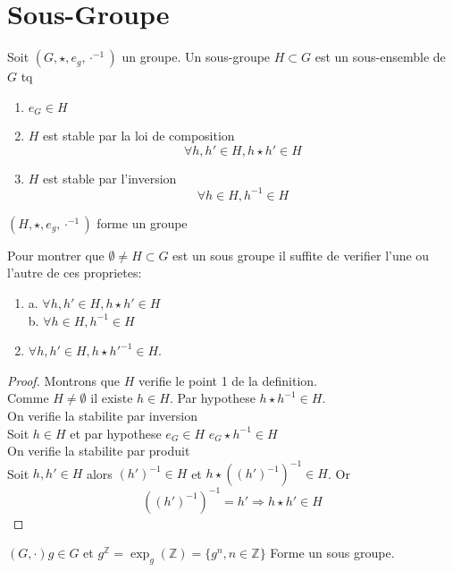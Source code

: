 \documentclass[../main.tex]{subfiles}
\begin{document}
\section{Sous-Groupe}
\begin{defn}\label{defn:sous_group}
	Soit $(G, \star, e_g, \cdot^{-1})$ un groupe.
	Un sous-groupe $H \subset G$ est un sous-ensemble de $G$ tq
	\begin{enumerate}
		\item $e_G \in H$ \\
		\item $H$ est stable par la loi de composition 
			\[ 
			\forall h,h' \in H , h\star h' \in H
			\]
		\item $H$ est stable par l'inversion
			\[ 
			\forall h \in H , h^{-1} \in H
			\]
			
	\end{enumerate}
$(H, \star, e_g, \cdot^{-1})$ forme un groupe
\end{defn}
\begin{propo}\label{propo:critere_de_sous_groupe}
	Pour montrer que $\emptyset \neq H \subset G$ est un sous groupe il suffite de verifier l'une ou l'autre de ces proprietes:
	\begin{enumerate}
		\item a. $\forall h,h' \in H , h\star h' \in H$\\
			b. $\forall h \in H, h^{-1} \in H$
		\item $\forall h,h' \in H, h \star h'^{-1}\in H$.
	\end{enumerate}
\end{propo}
\begin{proof}
Montrons que $H$ verifie le point 1 de la definition.\\
Comme $H\neq \emptyset$ il existe $h\in H$. Par hypothese $h\star h^{-1} \in H$.\\
On verifie la stabilite par inversion\\
Soit $h\in H$ et par hypothese $e_G \in H$ $e_G \star h^{-1}\in H$\\
On verifie la stabilite par produit\\
Soit $h,h' \in H$ alors $(h')^{-1} \in H$ et $h\star ( ( h')^{-1})^{-1}\in H$. 
Or
\[ 
	( ( h')^{-1})^{-1} = h' \Rightarrow h \star h' \in H
\]

\end{proof}
\begin{exemple}
	 $(G,\cdot) g \in G$ et $g^{\mathbb{Z}}= \exp_g(\mathbb{Z}) = \{g^{n}, n \in \mathbb{Z}\}$
	 Forme un sous groupe.
\end{exemple}
\end{document}
